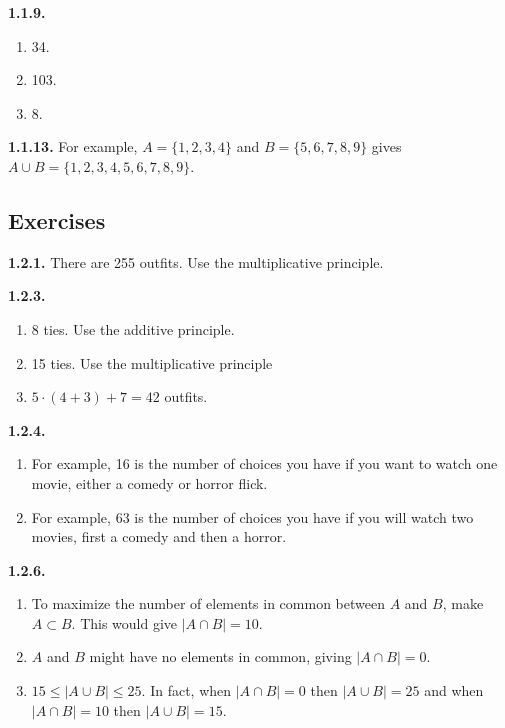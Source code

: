 \documentclass[10pt,]{book}
\theoremstyle{plain}
\theoremstyle{definition}
\theoremstyle{definition}
\theoremstyle{definition}
\theoremstyle{definition}
\numberwithin{equation}{chapter}
\newcommand{\card}[1]{\left| #1 \right|}
\begin{document}
%
\par\smallskip
\noindent\textbf{1.1.9.} \hypertarget{p-657}{}%
\leavevmode%
\begin{enumerate}[label=(\alph*)]
\item\hypertarget{li-322}{}\hypertarget{p-658}{}%
34.%
\item\hypertarget{li-323}{}\hypertarget{p-659}{}%
103.%
\item\hypertarget{li-324}{}\hypertarget{p-660}{}%
8.%
\end{enumerate}
%
\par\smallskip
\noindent\textbf{1.1.13.} \hypertarget{p-666}{}%
For example, \(A = \{1,2,3,4\}\) and \(B = \{5,6,7,8,9\}\) gives \(A \cup B = \{1,2,3,4,5,6,7,8,9\}\).%
\par\smallskip
\subsection*{ Exercises}
\noindent\textbf{1.2.1.} \hypertarget{p-746}{}%
There are 255 outfits. Use the multiplicative principle.%
\par\smallskip
\noindent\textbf{1.2.3.} \hypertarget{p-753}{}%
\leavevmode%
\begin{enumerate}[label=(\alph*)]
\item\hypertarget{li-338}{}\hypertarget{p-754}{}%
8 ties.  Use the additive principle.%
\item\hypertarget{li-339}{}15 ties. Use the multiplicative principle%
\item\hypertarget{li-340}{}\(5\cdot (4+3) + 7 = 42\) outfits.%
\end{enumerate}
%
\par\smallskip
\noindent\textbf{1.2.4.} \hypertarget{p-758}{}%
\leavevmode%
\begin{enumerate}[label=(\alph*)]
\item\hypertarget{li-343}{}\hypertarget{p-759}{}%
For example, 16 is the number of choices you have if you want to watch one movie, either a comedy or horror flick.%
\item\hypertarget{li-344}{}\hypertarget{p-760}{}%
For example, 63 is the number of choices you have if you will watch two movies, first a comedy and then a horror.%
\end{enumerate}
%
\par\smallskip
\noindent\textbf{1.2.6.} \hypertarget{p-767}{}%
\leavevmode%
\begin{enumerate}[label=(\alph*)]
\item\hypertarget{li-352}{}To maximize the number of elements in common between \(A\) and \(B\), make \(A \subset B\).  This would give \(\card{A \cap B} = 10\).%
\item\hypertarget{li-353}{}\(A\) and \(B\) might have no elements in common, giving \(\card{A\cap B} = 0\).%
\item\hypertarget{li-354}{}\(15 \le \card{A \cup B} \le 25\).  In fact, when \(\card{A \cap B} = 0\) then \(\card{A \cup B} = 25\) and when \(\card{A \cap B} = 10\) then \(\card{A \cup B} = 15\).%
\end{enumerate}
\end{document}
